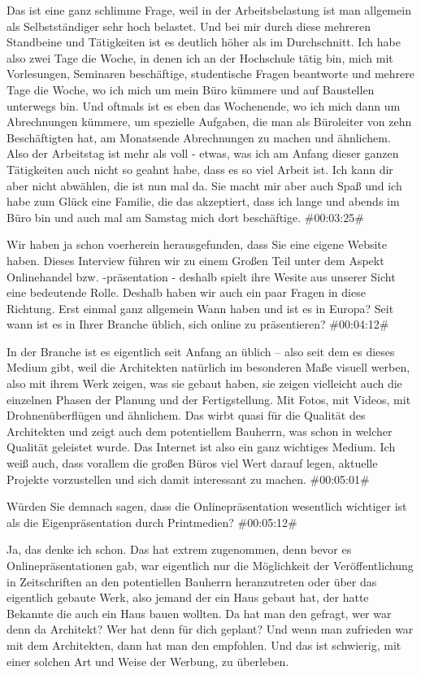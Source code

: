 \begin{description}
\Andre Das ist eine ganz schlimme Frage, weil in der Arbeitsbelastung ist man allgemein als Selbstständiger sehr hoch belastet. Und bei mir durch diese mehreren Standbeine und Tätigkeiten ist es deutlich höher als im Durchschnitt. Ich habe also zwei Tage die Woche, in denen ich an der Hochschule tätig bin, mich mit Vorlesungen, Seminaren beschäftige, studentische Fragen beantworte und mehrere Tage die Woche, wo ich mich um mein Büro kümmere und auf Baustellen unterwegs bin. Und oftmals ist es eben das Wochenende, wo ich mich dann um Abrechnungen kümmere, um spezielle Aufgaben, die man als Büroleiter von zehn Beschäftigten hat, am Monatsende Abrechnungen zu machen und ähnlichem. Also der Arbeitstag ist mehr als voll - etwas, was ich am Anfang dieser ganzen Tätigkeiten auch nicht so geahnt habe, dass es so viel Arbeit ist. Ich kann dir aber nicht abwählen, die ist nun mal da. Sie macht mir aber auch Spaß und ich habe zum Glück eine Familie, die das akzeptiert, dass ich lange und abends im Büro bin und auch mal am Samstag mich dort beschäftige. \#00:03:25\#

\Fabian Wir haben ja schon voerherein herausgefunden, dass Sie eine eigene Website haben. Dieses Interview führen wir zu einem Großen Teil unter dem Aspekt Onlinehandel bzw. -präsentation - deshalb spielt ihre Wesite aus unserer Sicht eine bedeutende Rolle. Deshalb haben wir auch ein paar Fragen in diese Richtung. Erst einmal ganz allgemein Wann haben und ist es in Europa? Seit wann ist es in Ihrer Branche üblich, sich online zu präsentieren? \#00:04:12\#

\Andre In der Branche ist es eigentlich seit Anfang an üblich – also seit dem es dieses Medium gibt, weil die Architekten natürlich im besonderen Maße visuell werben, also mit ihrem Werk zeigen, was sie gebaut haben, sie zeigen vielleicht auch die einzelnen Phasen der Planung und der Fertigstellung. Mit Fotos, mit Videos, mit Drohnenüberflügen und ähnlichem. Das wirbt quasi für die Qualität des Architekten und zeigt auch dem potentiellem Bauherrn, was schon in welcher Qualität geleistet wurde. Das Internet ist also ein ganz wichtiges Medium. Ich weiß auch, dass vorallem die großen Büros viel Wert darauf legen, aktuelle Projekte vorzustellen und sich damit interessant zu machen. \#00:05:01\#

\Toni Würden Sie demnach sagen, dass die Onlinepräsentation wesentlich wichtiger ist als die Eigenpräsentation durch Printmedien? \#00:05:12\#

\Andre Ja, das denke ich schon. Das hat extrem zugenommen, denn bevor es Onlinepräsentationen gab, war eigentlich nur die Möglichkeit der Veröffentlichung in Zeitschriften an den potentiellen Bauherrn heranzutreten oder über das eigentlich gebaute Werk, also jemand der ein Haus gebaut hat, der hatte Bekannte die auch ein Haus bauen wollten. Da hat man den gefragt, wer war denn da Architekt? Wer hat denn für dich geplant? Und wenn man zufrieden war mit dem Architekten, dann hat man den empfohlen. Und das ist schwierig, mit einer solchen Art und Weise der Werbung, zu überleben.


\end{description}
